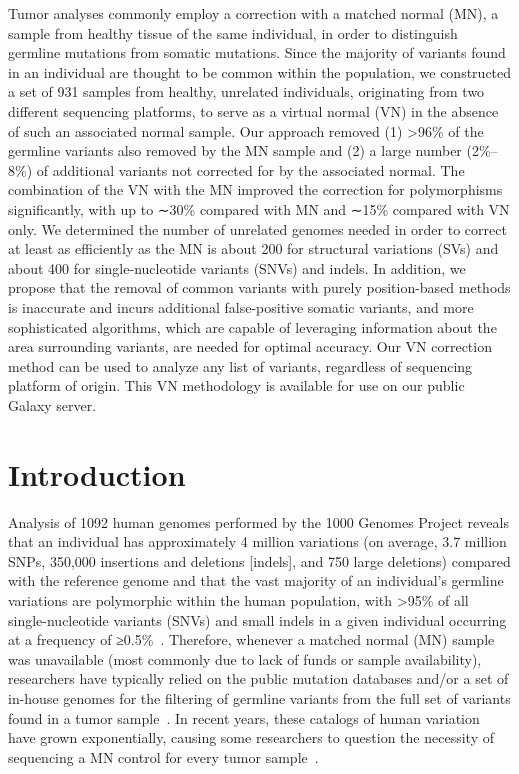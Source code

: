 Tumor analyses commonly employ a correction with a matched normal (MN), a sample from healthy tissue of the same individual, in order to distinguish germline mutations from somatic mutations. Since the majority of variants found in an individual are thought to be common within the population, we constructed a set of 931 samples from healthy, unrelated individuals, originating from two different sequencing platforms, to serve as a virtual normal (VN) in the absence of such an associated normal sample. Our approach removed (1) >96\% of the germline variants also removed by the MN sample and (2) a large number (2\%–8\%) of additional variants not corrected for by the associated normal. The combination of the VN with the MN improved the correction for polymorphisms significantly, with up to ∼30\% compared with MN and ∼15\% compared with VN only. We determined the number of unrelated genomes needed in order to correct at least as efficiently as the MN is about 200 for structural variations (SVs) and about 400 for single-nucleotide variants (SNVs) and indels. In addition, we propose that the removal of common variants with purely position-based methods is inaccurate and incurs additional false-positive somatic variants, and more sophisticated algorithms, which are capable of leveraging information about the area surrounding variants, are needed for optimal accuracy. Our VN correction method can be used to analyze any list of variants, regardless of sequencing platform of origin. This VN methodology is available for use on our public Galaxy server.

\section*{Introduction}

Analysis of 1092 human genomes performed by the 1000 Genomes Project reveals that an individual has approximately 4 million variations (on average, 3.7 million SNPs, 350,000 insertions and deletions [indels], and 750 large deletions) compared with the reference genome and that the vast majority of an individual's germline variations are polymorphic within the human population, with >95\% of all single-nucleotide variants (SNVs) and small indels in a given individual occurring at a frequency of ≥0.5\%~\cite{10002010map,10002012integrated}. Therefore, whenever a matched normal (MN) sample was unavailable (most commonly due to lack of funds or sample availability), researchers have typically relied on the public mutation databases and/or a set of in-house genomes for the filtering of germline variants from the full set of variants found in a tumor sample~\cite{yoon2009sensitive,kumar2011exome}. In recent years, these catalogs of human variation have grown exponentially, causing some researchers to question the necessity of sequencing a MN control for every tumor sample~\cite{kumar2011exome}.

